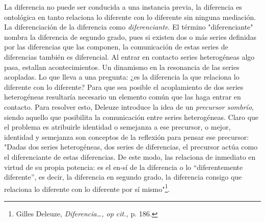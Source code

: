 \documentclass{book}
\begin{document}
La diferencia no puede ser conducida a una instancia previa, la
diferencia es ontológica en tanto relaciona lo diferente con lo
diferente sin ninguna mediación. La diferenciación de la diferencia como
\emph{diferenciante}. El término "diferenciante" nombra la diferencia de
segundo grado, pues si existen dos o más series definidas por las
diferencias que las componen, la comunicación de estas series de
diferencias también es diferencial. Al entrar en contacto series
heterogéneas algo pasa, estallan acontecimientos. Un dinamismo en la
resonancia de las series acopladas. Lo que lleva a una pregunta: ¿es la
diferencia la que relaciona lo diferente con lo diferente? Para que sea
posible el acoplamiento de dos series heterogéneas resultaría necesario
un elemento común que las haga entrar en contacto. Para resolver esto,
Deleuze introduce la idea de un \emph{precursor sombrío}, siendo aquello
que posibilita la comunicación entre series heterogéneas. Claro que el
problema es atribuirle identidad o semejanza a ese precursor, o mejor,
identidad y semejanza son conceptos de la reflexión para pensar ese
precursor: "Dadas dos series heterogéneas, dos series de diferencias, el
precursor actúa como el diferenciante de estas diferencias. De este
modo, las relaciona de inmediato en virtud de su propia potencia: es el
en-sí de la diferencia o lo ``diferentemente diferente'', es decir, la
diferencia en segundo grado, la diferencia consigo que relaciona lo
diferente con lo diferente por sí mismo"\footnote{Gilles Deleuze,
  \emph{Diferencia\ldots, op cit.,} p. 186.}.
\end{document}
